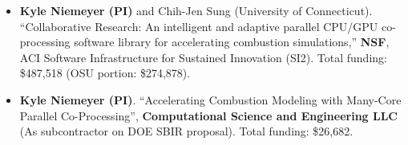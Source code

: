\documentclass[margin,line,11pt]{res}
\begin{document}
\begin{resume}
\begin{itemize}[leftmargin=*]
\item \textbf{Kyle Niemeyer (PI)} and Chih-Jen Sung (University of Connecticut).
``Collaborative Research: An intelligent and adaptive parallel CPU\slash GPU co-processing software library for accelerating combustion simulations,''
\textbf{NSF}, ACI Software Infrastructure for Sustained Innovation (SI2).
Total funding: \$487,518 (OSU portion: \$274,878).

\item \textbf{Kyle Niemeyer (PI)}.
``Accelerating Combustion Modeling with Many-Core Parallel Co-Pro\-cessing'',
\textbf{Computational Science and Engineering LLC} (As subcontractor on DOE SBIR proposal).
Total funding: \$26,682.

\end{itemize}

\end{resume}
\end{document}
